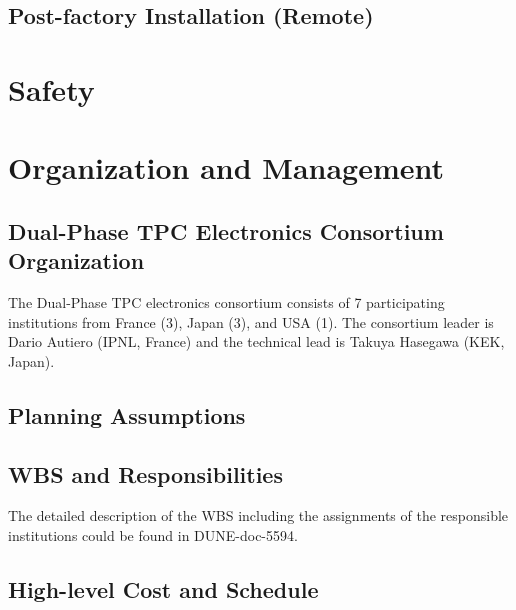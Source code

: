 \subsection{Post-factory Installation (Remote)}
\label{sec:fddp-tpc-elec-qc-remote}


\section{Safety}
\label{sec:fddp-tpc-elec-safety}





\section{Organization and Management}
\label{sec:fddp-tpc-elec-org}

\subsection{Dual-Phase TPC Electronics Consortium Organization}
\label{sec:fddp-tpc-elec-org-consortium}

The Dual-Phase TPC electronics consortium consists of \num{7} participating institutions from France (\num{3}), Japan (\num{3}), and USA (\num{1}). The consortium leader is Dario Autiero (IPNL, France) and the technical lead is Takuya Hasegawa (KEK, Japan).

\subsection{Planning Assumptions}
\label{sec:fddp-tpc-elec-org-assmp}


\subsection{WBS and Responsibilities}
\label{sec:fddp-tpc-elec-org-wbs}

The detailed description of the WBS including the assignments of the responsible institutions could be found in DUNE-doc-5594.

\subsection{High-level Cost and Schedule}
\label{sec:fddp-tpc-elec-org-cs}














